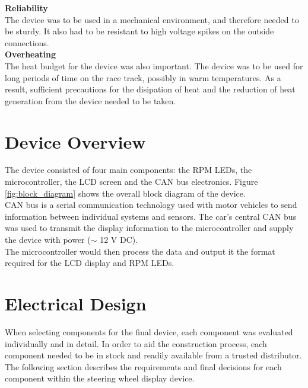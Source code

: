 \documentclass[a4paper,12pt]{article}
\begin{document}
\textbf{Reliability} \\

The device was to be used in a mechanical environment, and therefore needed to be sturdy. It also had to be resistant to high voltage spikes on the outside connections. \\

\textbf{Overheating} \\

The heat budget for the device was also important. The device was to be used for long periods of time on the race track, possibly in warm temperatures. As a result, sufficient precautions for the disipation of heat and the reduction of heat generation from the device needed to be taken.


\newpage
\section{Device Overview}
\label{sec:device_overview}

The device consisted of four main components: the RPM LEDs, the microcontroller, the LCD screen and the CAN bus electronics. Figure \ref{fig:block_diagram} shows the overall block diagram of the device. \\



CAN bus is a serial communication technology used with motor vehicles to send information between individual systems and sensors. The car's central CAN bus was used to transmit the display information to the microcontroller and supply the device with power ($\sim$ 12 V DC). \\

The microcontroller would then process the data and output it the format required for the LCD display and RPM LEDs. \\


\newpage
\section{Electrical Design}
\label{sec:electrical_design}

When selecting components for the final device, each component was evaluated individually and in detail. In order to aid the construction process, each component needed to be in stock and readily available from a trusted distributor. The following section describes the requirements and final decisions for each component within the steering wheel display device. \\
\end{document}
